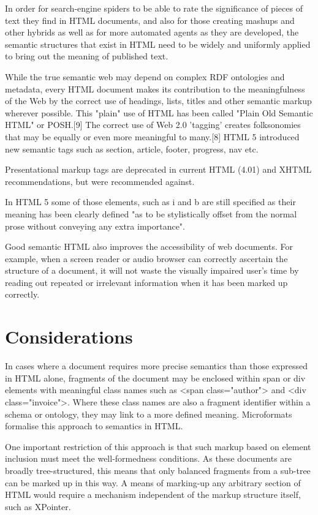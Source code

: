 In order for search-engine spiders to be able to rate the significance of pieces of text they find in HTML documents, and also for those creating mashups and other hybrids as well as for more automated agents as they are developed, the semantic structures that exist in HTML need to be widely and uniformly applied to bring out the meaning of published text.

While the true semantic web may depend on complex RDF ontologies and metadata, every HTML document makes its contribution to the meaningfulness of the Web by the correct use of headings, lists, titles and other semantic markup wherever possible. This "plain" use of HTML has been called "Plain Old Semantic HTML" or POSH.[9] The correct use of Web 2.0 'tagging' creates folksonomies that may be equally or even more meaningful to many.[8] HTML 5 introduced new semantic tags such as section, article, footer, progress, nav etc.

Presentational markup tags are deprecated in current HTML (4.01) and XHTML recommendations, but were recommended against.

In HTML 5 some of those elements, such as i and b are still specified as their meaning has been clearly defined "as to be stylistically offset from the normal prose without conveying any extra importance".

Good semantic HTML also improves the accessibility of web documents. For example, when a screen reader or audio browser can correctly ascertain the structure of a document, it will not waste the visually impaired user's time by reading out repeated or irrelevant information when it has been marked up correctly.

\section{Considerations}

In cases where a document requires more precise semantics than those expressed in HTML alone, fragments of the document may be enclosed within span or div elements with meaningful class names such as <span class="author"> and <div class="invoice">. Where these class names are also a fragment identifier within a schema or ontology, they may link to a more defined meaning. Microformats formalise this approach to semantics in HTML.

One important restriction of this approach is that such markup based on element inclusion must meet the well-formedness conditions. As these documents are broadly tree-structured, this means that only balanced fragments from a sub-tree can be marked up in this way. A means of marking-up any arbitrary section of HTML would require a mechanism independent of the markup structure itself, such as XPointer.


